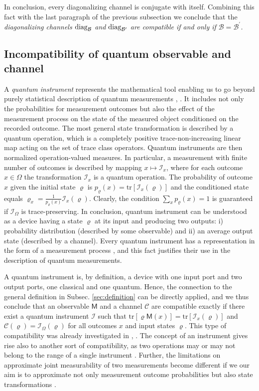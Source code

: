 \documentclass[12pt]{article}
\theoremstyle{definition}
\newcommand{\tr}[1]{\textrm{tr}\left[#1\right]} %
\newcommand{\Mo}{\mathsf{M}}%
\newcommand{\Cc}{\mathcal{C}} %
\newcommand{\Ii}{\mathcal{I}}
\begin{document}
{In conclusion, every diagonalizing channel is conjugate with itself. 
Combining this fact with the last paragraph of the previous subsection 
we conclude that the \emph{diagonalizing channels ${\rm diag}_{\mathcal{B}}$ 
and ${\rm diag}_{\mathcal{B^\prime}}$ are  compatible if and only if $\mathcal{B} = \mathcal{B^\prime}$.}

\subsection{Incompatibility of quantum observable and channel}

A \emph{quantum instrument} represents the mathematical tool enabling us to go beyond purely statistical description of quantum measurements \cite{OQP97}, \cite{MLQT12}. 
It includes not only the probabilities for measurement outcomes but also the effect of the measurement process on the state of the measured object
conditioned on the recorded outcome. 
The most general state transformation
is described by a quantum operation, which is a completely positive 
trace-non-increasing linear map acting on the set of trace class 
operators. 
Quantum instruments are then normalized operation-valued measures. 
In particular, a measurement with finite number of outcomes is described 
by mapping $x\mapsto\Ii_x$, where for each outcome $x\in\Omega$ 
the transformation $\Ii_x$ is a quantum operation. The probability of outcome $x$ given
the initial state $\varrho$ is $p_\varrho(x)=\tr{\Ii_x(\varrho)}$ and the
conditioned state equals 
$\varrho_x=\frac{1}{p_\varrho(x)}\Ii_x(\varrho)$. 
Clearly, the condition $\sum_x p_\varrho(x)=1$ is guaranteed if $\Ii_\Omega$ 
is trace-preserving. 
In conclusion, quantum instrument can be understood as a device
having a state $\varrho$ at its input and producing two outputs: 
i) probability distribution (described by some observable) and 
ii) an average output state (described by a channel). 
Every quantum instrument has a representation in the form of a measurement process \cite{Ozawa84}, and this fact justifies their use in the description of quantum measurements. 

A quantum instrument is, by definition, a device with one input port and two output ports, one classical and one quantum.
Hence, the connection to the general definition in Subsec. \ref{sec:definition} can be directly applied, and we thus conclude that an observable $\Mo$ and a channel $\Cc$ are compatible exactly if there exist a quantum instrument $\Ii$ such that $\tr{\varrho\Mo(x)}=\tr{\Ii_x(\varrho)}$ and $\Cc(\varrho)=\Ii_\Omega(\varrho)$ for all outcomes $x$ and input states $\varrho$.
This type of compatibility was already investigated in \cite{Ozawa84}, \cite{Ozawa85}.  
The concept of an instrument gives rise also to another sort of compatibility, as two operations may or may not belong to the range of a single instrument \cite{HeReStZi09}.
Further, the limitations on approximate joint measurability of two measurements become different if we our aim is to approximate not only measurement outcome probabilities but also state transformations \cite{HeJiReZi10}.

}
\end{document}
